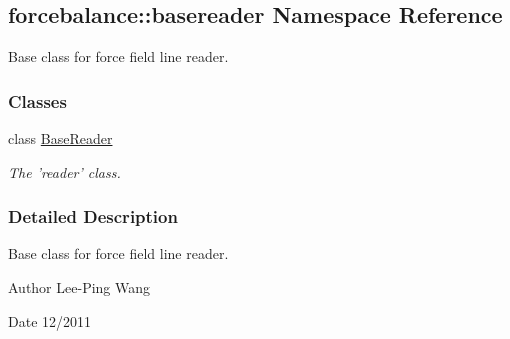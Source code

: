 \hypertarget{namespaceforcebalance_1_1basereader}{\subsection{forcebalance\-:\-:basereader \-Namespace \-Reference}
\label{namespaceforcebalance_1_1basereader}
}


\-Base class for force field line reader.  


\subsubsection*{\-Classes}
\begin{DoxyCompactItemize}
\item 
class \hyperlink{classforcebalance_1_1basereader_1_1BaseReader}{\-Base\-Reader}
\begin{DoxyCompactList}\small\item\em \-The 'reader' class. \end{DoxyCompactList}\end{DoxyCompactItemize}


\subsubsection{\-Detailed \-Description}
\-Base class for force field line reader. \begin{DoxyAuthor}{\-Author}
\-Lee-\/\-Ping \-Wang 
\end{DoxyAuthor}
\begin{DoxyDate}{\-Date}
12/2011 
\end{DoxyDate}
